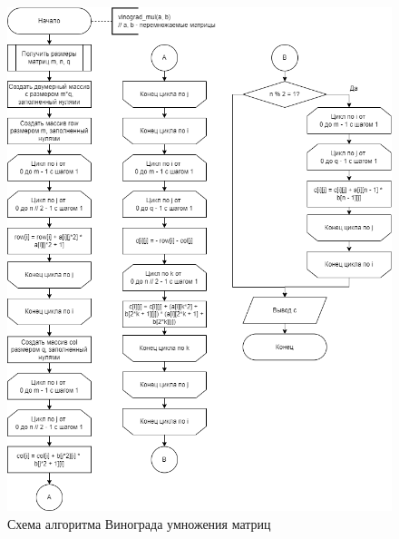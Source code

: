 \begin{figure}[h!btp]
	\centering
	\includegraphics[width=450pt]{inc/diagram-vinograd.png}
	\caption{Схема алгоритма Винограда умножения матриц}
	\label{fig:diagram-vinograd}	
\end{figure}
\clearpage

